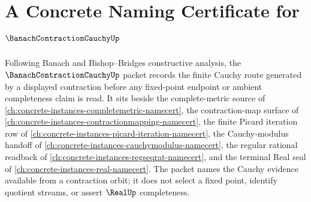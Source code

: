 \chapter{A Concrete Naming Certificate for $\BanachContractionCauchyUp$}
\label{ch:concrete-instances-banach-contraction-cauchy-namecert}

Following Banach and Bishop--Bridges constructive analysis, the $\BanachContractionCauchyUp$ packet records the finite Cauchy route generated by a displayed contraction before any fixed-point endpoint or ambient completeness claim is read. It sits beside the complete-metric source of \autoref{ch:concrete-instances-completemetric-namecert}, the contraction-map surface of \autoref{ch:concrete-instances-contractionmapping-namecert}, the finite Picard iteration row of \autoref{ch:concrete-instances-picard-iteration-namecert}, the Cauchy-modulus handoff of \autoref{ch:concrete-instances-cauchymodulus-namecert}, the regular rational readback of \autoref{ch:concrete-instances-regseqrat-namecert}, and the terminal Real seal of \autoref{ch:concrete-instances-real-namecert}. The packet names the Cauchy evidence available from a contraction orbit; it does not select a fixed point, identify quotient streams, or assert $\RealUp$ completeness.

